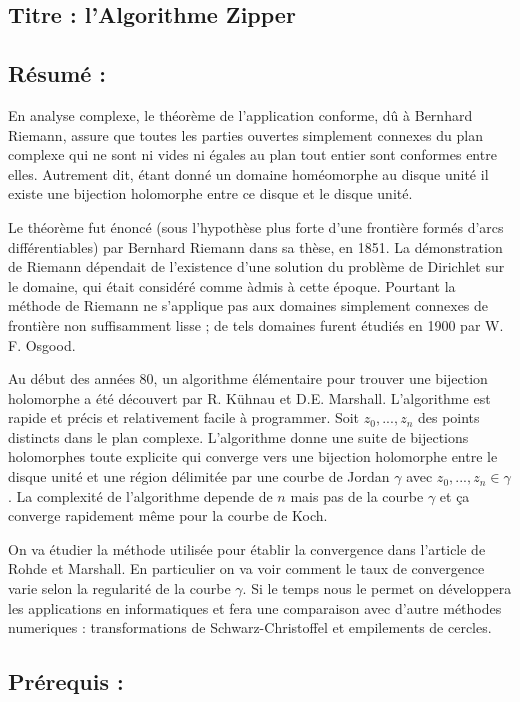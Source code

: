 \documentclass[]{article}
\date{}
\begin{document}
\subsection{Titre : l'Algorithme Zipper}\label{titre-lalgorithme-zipper}

\subsection{Résumé :}\label{ruxe9sumuxe9}

En analyse complexe, le théorème de l'application conforme, dû à
Bernhard Riemann, assure que toutes les parties ouvertes simplement
connexes du plan complexe qui ne sont ni vides ni égales au plan tout
entier sont conformes entre elles. Autrement dit, étant donné un domaine
homéomorphe au disque unité il existe une bijection holomorphe entre ce
disque et le disque unité.

Le théorème fut énoncé (sous l'hypothèse plus forte d'une frontière
formés d'arcs différentiables) par Bernhard Riemann dans sa thèse, en
1851. La démonstration de Riemann dépendait de l'existence d'une
solution du problème de Dirichlet sur le domaine, qui était considéré
comme àdmis à cette époque. Pourtant la méthode de Riemann ne s'applique
pas aux domaines simplement connexes de frontière non suffisamment lisse
; de tels domaines furent étudiés en 1900 par W. F. Osgood.

Au début des années 80, un algorithme élémentaire pour trouver une
bijection holomorphe a été découvert par R. Kühnau et D.E. Marshall.
L'algorithme est rapide et précis et relativement facile à programmer.
Soit \(z_0, ..., z_n\) des points distincts dans le plan complexe.
L'algorithme donne une suite de bijections holomorphes toute explicite
qui converge vers une bijection holomorphe entre le disque unité et une
région délimitée par une courbe de Jordan \(\gamma\) avec
\(z_0, ..., z_n \in \gamma\). La complexité de l'algorithme depende de
\(n\) mais pas de la courbe \(\gamma\) et ça converge rapidement même
pour la courbe de Koch.

On va étudier la méthode utilisée pour établir la convergence dans
l'article de Rohde et Marshall. En particulier on va voir comment le
taux de convergence varie selon la regularité de la courbe \(\gamma\).
Si le temps nous le permet on développera les applications en
informatiques et fera une comparaison avec d'autre méthodes numeriques :
transformations de Schwarz-Christoffel et empilements de cercles.

\subsection{Prérequis :}\label{pruxe9requis}
\end{document}
